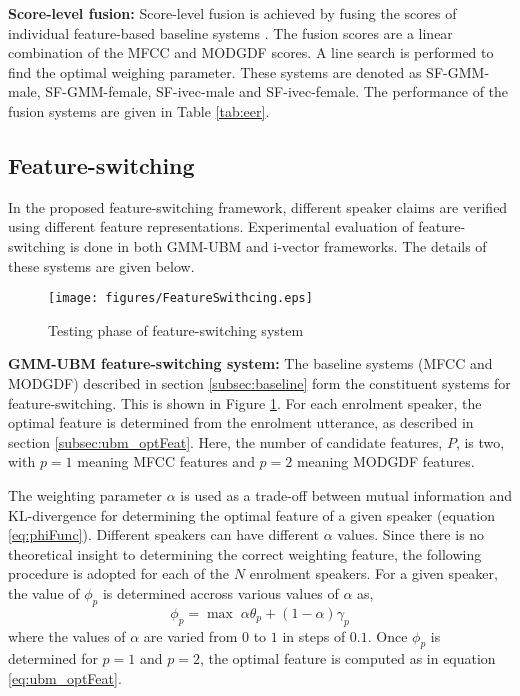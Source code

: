\documentclass{article}
\begin{document}
\textbf{Score-level fusion:}  Score-level fusion is achieved by
fusing the scores of individual feature-based baseline systems
\cite{fusion}. The fusion scores are a linear combination of
the MFCC and MODGDF scores. A line search is performed to find
the optimal weighing parameter. These systems are denoted as
SF-GMM-male, SF-GMM-female, SF-ivec-male and SF-ivec-female.
The performance of the fusion systems are given in Table
\ref{tab:eer}. 

	
\subsection{Feature-switching}
\label{subsec:featSwitch}

In the proposed feature-switching framework, different speaker
claims are verified using different feature representations. 
Experimental evaluation of feature-switching is done in both
GMM-UBM and i-vector frameworks. The details of these systems
are given below.

\begin{figure}[h]
\texttt{[image: figures/FeatureSwithcing.eps]}
\caption{Testing phase of feature-switching system}
\label{fig:systemArch2}
\end{figure}


\textbf{GMM-UBM feature-switching system:}
The baseline systems (MFCC and MODGDF) described in section \ref{subsec:baseline} 
form the constituent systems for feature-switching. This is shown in Figure
\ref{fig:systemArch2}. For each enrolment speaker, the optimal feature is 
determined from the enrolment utterance, as described in section \ref{subsec:ubm_optFeat}. Here, the number of candidate features, $P$, is two, with $p=1$ meaning 
MFCC features and $p=2$ meaning MODGDF features.

The weighting parameter $\alpha$ is used as a trade-off between mutual information and
KL-divergence for determining the optimal feature of a given speaker (equation
\ref{eq:phiFunc}). Different speakers can have different $\alpha$ values. Since
there is no theoretical insight to determining the correct weighting feature,
the following procedure is adopted for each of the $N$ enrolment speakers.
For a given speaker, the value of $\phi_p$ is determined accross various values
of $\alpha$ as, 
\begin{equation}
\phi_p = \max \; \alpha \theta_p + (1-\alpha) \gamma_p
\end{equation}
where the values of $\alpha$ are varied from $0$ to $1$ in steps of $0.1$. Once
$\phi_p$ is determined for $p=1$ and $p=2$, the optimal feature is computed as in equation
\ref{eq:ubm_optFeat}.
\end{document}
